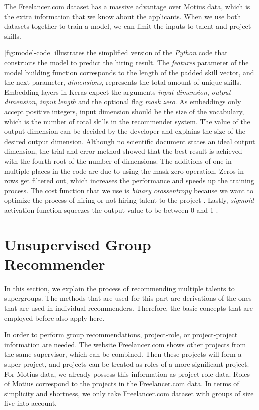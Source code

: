 The Freelancer.com dataset has a massive advantage over Motius data, which is the extra information that we know about the applicants. When we use both datasets together to train a model, we can limit the inputs to talent and project skills. 

\autoref{fig:model-code} illustrates the simplified version of the \textit{Python} code that constructs the model to predict the hiring result. The \textit{features} parameter of the model building function corresponds to the length of the padded skill vector, and the next parameter, \textit{dimensions}, represents the total amount of unique skills. Embedding layers in Keras expect the arguments \textit{input dimension}, \textit{output dimension}, \textit{input length} and the optional flag \textit{mask zero}. As embeddings only accept positive integers, input dimension should be the size of the vocabulary, which is the number of total skills in the recommender system. The value of the output dimension can be decided by the developer and explains the size of the desired output dimension. Although no scientific document states an ideal output dimension, the trial-and-error method showed that the best result is achieved with the fourth root of the number of dimensions. The additions of one in multiple places in the code are due to using the mask zero operation. Zeros in rows get filtered out, which increases the performance and speeds up the training process. The cost function that we use is \textit{binary crossentropy} because we want to optimize the process of hiring or not hiring talent to the project \cite{murphy2012machine}. Lastly, \textit{sigmoid} activation function squeezes the output value to be between 0 and 1 \cite{pedamonti2018comparison}.


\section{Unsupervised Group Recommender}\label{section:unsupervised-group-rec}

In this section, we explain the process of recommending multiple talents to supergroups. The methods that are used for this part are derivations of the ones that are used in individual recommenders. Therefore, the basic concepts that are employed before also apply here. 

In order to perform group recommendations, project-role, or project-project information are needed. The website Freelancer.com shows other projects from the same supervisor, which can be combined. Then these projects will form a super project, and projects can be treated as roles of a more significant project. For Motius data, we already possess this information as project-role data. Roles of Motius correspond to the projects in the Freelancer.com data. In terms of simplicity and shortness, we only take Freelancer.com dataset with groups of size five into account. 

